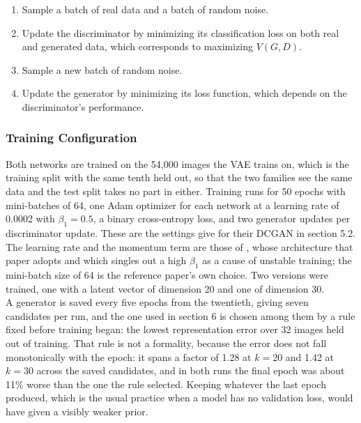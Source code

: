 \begin{enumerate}
    \item Sample a batch of real data and a batch of random noise.
    \item Update the discriminator by minimizing its classification loss on both real and generated data, which corresponds to maximizing \( V(G,D) \).
    \item Sample a new batch of random noise.
    \item Update the generator by minimizing its loss function, which depends on the discriminator's performance.
\end{enumerate}

\subsubsection{Training Configuration}

Both networks are trained on the 54,000 images the VAE trains on, which is the training split with the same tenth held out, so that the two families see the same data and the test split takes no part in either. Training runs for 50 epochs with mini-batches of 64, one Adam optimizer for each network at a learning rate of 0.0002 with \( \beta_1 = 0.5 \), a binary cross-entropy loss, and two generator updates per discriminator update. These are the settings \cite{bora2017} give for their DCGAN in section 5.2. The learning rate and the momentum term are those of \cite{radford2016}, whose architecture that paper adopts and which singles out a high \( \beta_1 \) as a cause of unstable training; the mini-batch size of 64 is the reference paper's own choice. Two versions were trained, one with a latent vector of dimension 20 and one of dimension 30.
\\
A generator is saved every five epochs from the twentieth, giving seven candidates per run, and the one used in section 6 is chosen among them by a rule fixed before training began: the lowest representation error over 32 images held out of training. That rule is not a formality, because the error does not fall monotonically with the epoch: it spans a factor of 1.28 at \( k = 20 \) and 1.42 at \( k = 30 \) across the saved candidates, and in both runs the final epoch was about 11\% worse than the one the rule selected. Keeping whatever the last epoch produced, which is the usual practice when a model has no validation loss, would have given a visibly weaker prior.


